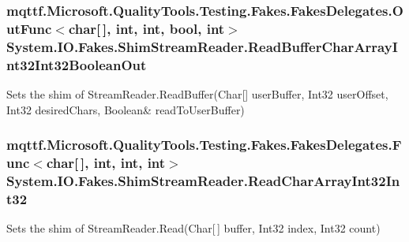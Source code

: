 \hypertarget{class_system_1_1_i_o_1_1_fakes_1_1_shim_stream_reader_aba828155327bcca0c8c5c4eabfdc2818}{
\subsubsection[{Read\-Buffer\-Char\-Array\-Int32\-Int32\-Boolean\-Out}]{\setlength{\rightskip}{0pt plus 5cm}mqttf.\-Microsoft.\-Quality\-Tools.\-Testing.\-Fakes.\-Fakes\-Delegates.\-Out\-Func$<$char\mbox{[}$\,$\mbox{]}, int, int, bool, int$>$ System.\-I\-O.\-Fakes.\-Shim\-Stream\-Reader.\-Read\-Buffer\-Char\-Array\-Int32\-Int32\-Boolean\-Out\hspace{0.3cm}{\ttfamily [set]}}}\label{class_system_1_1_i_o_1_1_fakes_1_1_shim_stream_reader_aba828155327bcca0c8c5c4eabfdc2818}


Sets the shim of Stream\-Reader.\-Read\-Buffer(Char\mbox{[}\mbox{]} user\-Buffer, Int32 user\-Offset, Int32 desired\-Chars, Boolean\& read\-To\-User\-Buffer)

\hypertarget{class_system_1_1_i_o_1_1_fakes_1_1_shim_stream_reader_a88d1976ef62e57d4b0c66c8ef68a9a6e}{
\subsubsection[{Read\-Char\-Array\-Int32\-Int32}]{\setlength{\rightskip}{0pt plus 5cm}mqttf.\-Microsoft.\-Quality\-Tools.\-Testing.\-Fakes.\-Fakes\-Delegates.\-Func$<$char\mbox{[}$\,$\mbox{]}, int, int, int$>$ System.\-I\-O.\-Fakes.\-Shim\-Stream\-Reader.\-Read\-Char\-Array\-Int32\-Int32\hspace{0.3cm}{\ttfamily [set]}}}\label{class_system_1_1_i_o_1_1_fakes_1_1_shim_stream_reader_a88d1976ef62e57d4b0c66c8ef68a9a6e}


Sets the shim of Stream\-Reader.\-Read(\-Char\mbox{[}$\,$\mbox{]} buffer, Int32 index, Int32 count)

